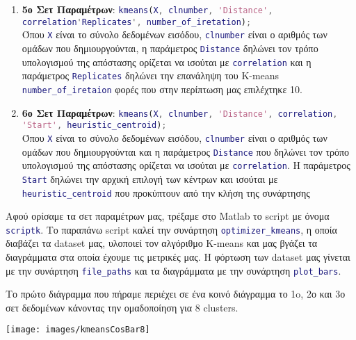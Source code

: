 \begin{enumerate}
\item \textbf{5ο Σετ Παραμέτρων}:
\lstinline[language=MATLAB, breaklines=true]!kmeans(X, clnumber, 'Distance', correlation'Replicates', number_of_iretation);!
\\Όπου
\lstinline[language=MATLAB]!X! είναι το σύνολο δεδομένων εισόδου,
\lstinline[language=MATLAB]!clnumber! είναι ο αριθμός των ομάδων που δημιουργούνται, η παράμετρος
\lstinline[language=MATLAB]!Distance! δηλώνει τον τρόπο υπολογισμού της απόστασης ορίζεται να ισούται με
\lstinline[language=MATLAB]!correlation! και η παράμετρος \lstinline[language=MATLAB]!Replicates! δηλώνει την επανάληψη του K-means
\lstinline[language=MATLAB]!number_of_iretaion! φορές που στην περίπτωση μας επιλέχτηκε 10.

\item \textbf{6ο Σετ Παραμέτρων}:
\lstinline[language=MATLAB, breaklines=true]!kmeans(X, clnumber, 'Distance', correlation, 'Start', heuristic_centroid);!
\\Όπου
\lstinline[language=MATLAB]!X! είναι το σύνολο δεδομένων εισόδου,
\lstinline[language=MATLAB]!clnumber! είναι ο αριθμός των ομάδων που δημιουργούνται και η παράμετρος
\lstinline[language=MATLAB]!Distance! που δηλώνει τον τρόπο υπολογισμού της απόστασης ορίζεται να ισούται με
\lstinline[language=MATLAB]!correlation!.
Η παράμετρος \lstinline[language=MATLAB]!Start! δηλώνει την αρχική επιλογή των κέντρων και ισούται με
\lstinline[language=MATLAB]!heuristic_centroid! που προκύπτουν από την κλήση της συνάρτησης
\end{enumerate}

Αφού ορίσαμε τα σετ παραμέτρων μας, τρέξαμε στο Matlab το script με όνομα \lstinline[language=MATLAB]!scriptk!.
Tο παραπάνω script καλεί την συνάρτηση \lstinline[language=MATLAB]!optimizer_kmeans!, η οποία διαβάζει τα dataset μας, υλοποιεί τον αλγόριθμο K-means και μας βγάζει τα διαγράμματα στα οποία έχουμε τις μετρικές μας.
Η φόρτωση των dataset μας γίνεται με την συνάρτηση \lstinline[language=MATLAB]!file_paths! και τα διαγράμματα με την συνάρτηση \lstinline[language=MATLAB]!plot_bars!.

Το πρώτο διάγραμμα που πήραμε περιέχει σε ένα κοινό διάγραμμα το 1o, 2ο και 3ο σετ δεδομένων κάνοντας την ομαδοποίηση για 8 clusters.

\noindent\begin{minipage}{\linewidth}
    \centering
    \texttt{[image: images/kmeansCosBar8]}
    \label{fig:kmeansCosBar8}
\end{minipage}

